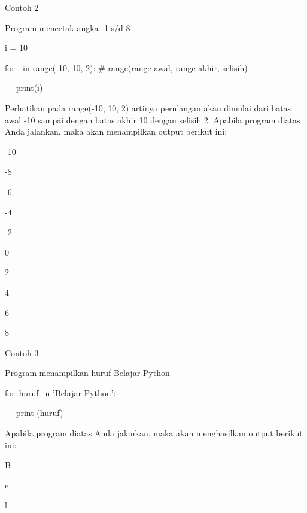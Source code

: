 \vspace{\baselineskip}
Contoh 2\vspace{\baselineskip}
\vspace{\baselineskip}
 \par
 Program mencetak angka -1 s/d 8 \par
\vspace{12pt}
i = 10 \par
for i in range(-10, 10, 2):  $  \#  $ range(range awal, range akhir, selisih) \par
~~ print(i) \par
\vspace{12pt}
\vspace{\baselineskip}
Perhatikan pada range(-10, 10, 2) artinya perulangan akan dimulai dari batas awal -10 sampai dengan batas akhir 10 dengan selisih 2.\vspace{\baselineskip}
\vspace{\baselineskip}
Apabila program diatas Anda jalankan, maka akan menampilkan output berikut ini:\vspace{\baselineskip}
\vspace{\baselineskip}
 \par
-10 \par
-8 \par
-6 \par
-4 \par
-2 \par
0 \par
2 \par
4 \par
6 \par
8 \par
\vspace{\baselineskip}
Contoh 3\vspace{\baselineskip}
\vspace{\baselineskip}
 \par
Program menampilkan huruf Belajar Python \par
for~huruf~in 'Belajar Python':    \par
~~ print (huruf) \par
\vspace{\baselineskip}
Apabila program diatas Anda jalankan, maka akan menghasilkan output berikut ini:\vspace{\baselineskip}
\vspace{\baselineskip}
 \par
B \par
e \par
l \par
